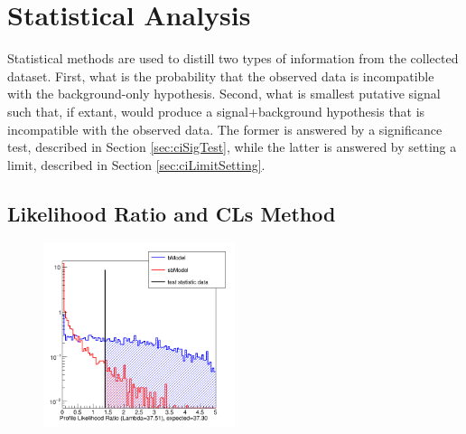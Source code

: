 \section{Statistical Analysis}\label{sec:ciStat}

Statistical methods are used to distill two types of information from the collected dataset.
First, what is the probability that the observed data is incompatible with the background-only hypothesis.
Second, what is smallest putative signal such that, if extant, would produce a signal+background hypothesis that is incompatible with the observed data.
The former is answered by a significance test, described in Section \ref{sec:ciSigTest}, while the latter is answered by setting a limit, described in Section \ref{sec:ciLimitSetting}.

\subsection{Likelihood Ratio and CLs Method}


\begin{figure}[h!]
\captionsetup[subfigure]{position=b}
\centering
\includegraphics[width=0.5\textwidth]{figures/ci/profileLikelihoodPlots/toys-n29-fc-lambda-ll-const-LL-nToy5000-nSteps50-seed8.png}
\caption{}
\label{fig:ciClsProfileLikelihood}
\end{figure}

